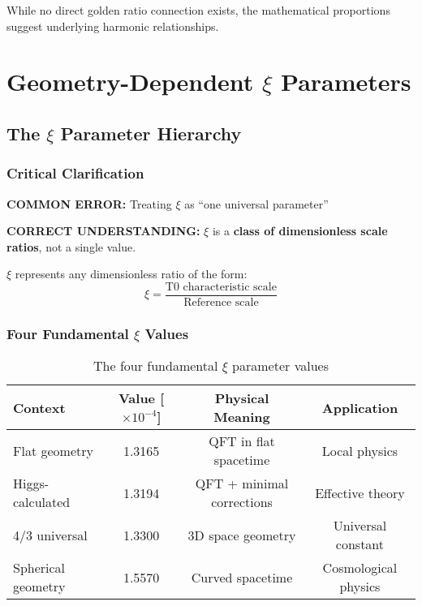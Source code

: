 \documentclass[12pt,a4paper]{article}
\newcommand{\xipar}{\ensuremath{\xi}}
\newcommand{\mytimes}{\ensuremath{\times}}
\begin{document}
	While no direct golden ratio connection exists, the mathematical proportions suggest underlying harmonic relationships.
	
	\section{Geometry-Dependent $\xi$ Parameters}
	\label{sec:geometry_dependent_xi}
	
	\subsection{The $\xi$ Parameter Hierarchy}
	\label{subsec:xi_hierarchy}
	
	\subsubsection{Critical Clarification}
	\label{subsubsec:critical_clarification}
	
	\begin{tcolorbox}[colback=red!10!white,colframe=red!75!black,title=CRITICAL WARNING: $\xi$ Parameter Confusion]
		\textbf{COMMON ERROR:} Treating $\xi$ as ``one universal parameter''
		
		\textbf{CORRECT UNDERSTANDING:} $\xi$ is a \textbf{class of dimensionless scale ratios}, not a single value.
		
		$\xi$ represents any dimensionless ratio of the form:
		\begin{equation}
			\xipar = \frac{\text{T0 characteristic scale}}{\text{Reference scale}}
		\end{equation}
	\end{tcolorbox}
	
	\subsubsection{Four Fundamental $\xi$ Values}
	\label{subsubsec:four_fundamental_values}
	
	\begin{table}[htbp]
		\centering
		\begin{tabular}{lccc}
			\toprule
			\textbf{Context} & \textbf{Value [$\mytimes 10^{-4}$]} & \textbf{Physical Meaning} & \textbf{Application} \\
			\midrule
			Flat geometry & 1.3165 & QFT in flat spacetime & Local physics \\
			Higgs-calculated & 1.3194 & QFT + minimal corrections & Effective theory \\
			4/3 universal & 1.3300 & 3D space geometry & Universal constant \\
			Spherical geometry & 1.5570 & Curved spacetime & Cosmological physics \\
			\bottomrule
		\end{tabular}
		\caption{The four fundamental $\xi$ parameter values}
		\label{tab:four_xi_values}
	\end{table}
	
\end{document}
